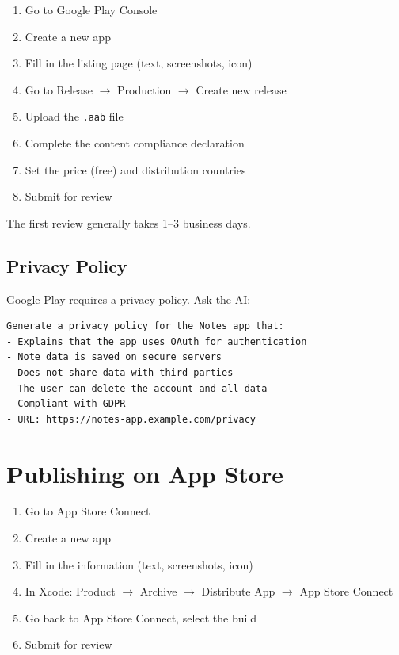 \begin{enumerate}
  \item Go to Google Play Console
  \item Create a new app
  \item Fill in the listing page (text, screenshots, icon)
  \item Go to Release $\rightarrow$ Production $\rightarrow$ Create new release
  \item Upload the \texttt{.aab} file
  \item Complete the content compliance declaration
  \item Set the price (free) and distribution countries
  \item Submit for review
\end{enumerate}

The first review generally takes 1--3 business days.

\subsection{Privacy Policy}

Google Play requires a privacy policy. Ask the AI:

\begin{praticabox}[title={Hands-on --- Privacy policy}]
\begin{lstlisting}[language={}]
Generate a privacy policy for the Notes app that:
- Explains that the app uses OAuth for authentication
- Note data is saved on secure servers
- Does not share data with third parties
- The user can delete the account and all data
- Compliant with GDPR
- URL: https://notes-app.example.com/privacy
\end{lstlisting}
\end{praticabox}

\section{Publishing on App Store}

\begin{enumerate}
  \item Go to App Store Connect
  \item Create a new app
  \item Fill in the information (text, screenshots, icon)
  \item In Xcode: Product $\rightarrow$ Archive $\rightarrow$ Distribute App $\rightarrow$ App Store Connect
  \item Go back to App Store Connect, select the build
  \item Submit for review
\end{enumerate}

